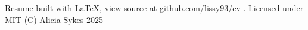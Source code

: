 \documentclass[]{resume-format}
\begin{document}
\vspace{10mm}
\begin{center}
    \tiny\color{lightgray}
    Resume built with LaTeX, view source at
    \href{https://github.com/lissy93/cv}{ github.com/lissy93/cv }.
    Licensed under MIT (C)
    \href{https://aliciasykes.com}{ Alicia Sykes } 2025
\end{center}
\ 
\end{document}
